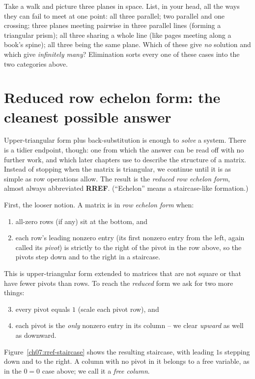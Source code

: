 \begin{walkbox}
Take a walk and picture three planes in space. List, in your head, all the ways
they can fail to meet at one point: all three parallel; two parallel and one
crossing; three planes meeting pairwise in three parallel lines (forming a
triangular prism); all three sharing a whole line (like pages meeting along a
book's spine); all three being the
same plane. Which of these give \emph{no} solution and which give
\emph{infinitely many}? Elimination sorts every one of these cases into the
two categories above.
\end{walkbox}

\section{Reduced row echelon form: the cleanest possible answer}

Upper-triangular form plus back-substitution is enough to \emph{solve} a system.
There is a tidier endpoint, though: one from which the answer can be read off with
no further work, and which later chapters use to describe the structure of a matrix.
Instead of stopping when the matrix is triangular, we continue until it is as
simple as row operations allow. The result is the \emph{reduced row echelon
form}, almost always abbreviated \textbf{RREF}. (``Echelon'' means a
staircase-like formation.)

First, the looser notion. A matrix is in \emph{row echelon form} when:
\begin{enumerate}
  \item all-zero rows (if any) sit at the bottom, and
  \item each row's leading nonzero entry (its first nonzero entry from the left,
  again called its \emph{pivot}) is strictly to the
  right of the pivot in the row above, so the pivots step down and to the
  right in a staircase.
\end{enumerate}
This is upper-triangular form extended to matrices that are not square or that
have fewer pivots than rows. To reach the \emph{reduced} form we ask for two more things:
\begin{enumerate}
  \setcounter{enumi}{2}
  \item every pivot equals $1$ (scale each pivot row), and
  \item each pivot is the \emph{only} nonzero entry in its column -- we clear
  \emph{upward} as well as downward.
\end{enumerate}
Figure~\ref{ch07:rref-staircase} shows the resulting staircase, with leading
$1$s stepping down and to the right. A column with no pivot in it belongs to a
free variable, as in the $0=0$ case above; we call it a \emph{free column}.

